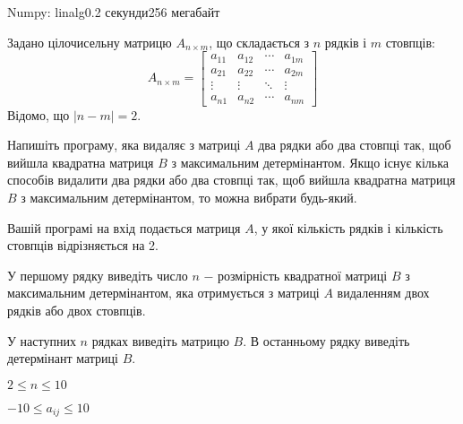 \begin{problem}{Numpy: linalg}{}{}{0.2 секунди}{256 мегабайт}

Задано цілочисельну матрицю $A_{n\times m}$, що складається з $n$ рядків і $m$ стовпців:
$$
A_{n\times m} = \begin{bmatrix}
a_{11} & a_{12} & \cdots & a_{1m} \\
a_{21} & a_{22} & \cdots & a_{2m} \\
\vdots & \vdots & \ddots & \vdots \\
a_{n1} & a_{n2} & \cdots & a_{nm}
\end{bmatrix}
$$
Відомо, що $|n - m| = 2$.

Напишіть програму, яка видаляє з матриці $A$ два рядки або два стовпці так, щоб вийшла квадратна матриця $B$ з максимальним детермінантом.
Якщо існує кілька способів видалити два рядки або два стовпці так, щоб вийшла квадратна матриця $B$ з максимальним детермінантом, то можна вибрати будь-який.


\InputFile
Вашій програмі на вхід подається матриця $A$, у якої кількість рядків і кількість стовпців відрізняється на 2.

\OutputFile
У першому рядку виведіть число $n$ $-$ розмірність квадратної матриці $B$ з максимальним детермінантом, 
яка отримується з матриці $A$ видаленням двох рядків або двох стовпців. 

У наступних $n$ рядках виведіть матрицю $B$.
В останньому рядку виведіть детермінант матриці $B$.

\Constraints

$2 \le n \le 10$

$-10 \le a_{ij} \le 10$

\Examples
\begin{example}
%
%
\end{example}

\end{problem}

